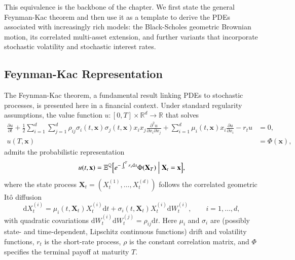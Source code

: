 \documentclass[12pt]{report} %
\theoremstyle{plain} %
\theoremstyle{definition} %
\theoremstyle{remark} %
\begin{document}
This equivalence is the backbone of the chapter. 
We first state the general Feynman-Kac theorem and then use it
as a template to derive the PDEs associated with increasingly rich
models: the Black-Scholes geometric Brownian motion, its correlated
multi-asset extension, and further variants that incorporate
stochastic volatility and stochastic interest rates. 

\subsection{Feynman-Kac Representation}\label{sec:feynman_kac}

The Feynman-Kac theorem, a fundamental result linking PDEs to stochastic processes, is presented here in a financial context.
Under standard regularity assumptions, the value function \(u:[0,T]\times\mathbb R^d\to\mathbb R\) that solves
\begin{equation}\label{eq:fk_pde_multi}
	\begin{aligned}
		\frac{\partial u}{\partial t}
		+ \frac{1}{2}\sum_{i=1}^{d}\sum_{j=1}^{d}
		 \rho_{ij}\sigma_i(t,\mathbf x)\sigma_j(t,\mathbf x)x_i x_j
		 \frac{\partial^{2}u}{\partial x_i\partial x_j}
		+ \sum_{i=1}^{d}\mu_i(t,\mathbf x)x_i\frac{\partial u}{\partial x_i}
		- r_t u &= 0,\\
		u(T,\mathbf x)&=\Phi(\mathbf x),
	\end{aligned}
\end{equation}
admits the probabilistic representation
\begin{equation}\label{eq:feynman_kac}
	u(t,\mathbf x)=
	\mathbb E^{\mathbb Q}\Bigl[
		e^{-\int_t^{T} r_s \mathrm ds}
		\Phi(\mathbf X_T)
		\Bigm| \mathbf X_t=\mathbf x
	\Bigr],
\end{equation}
where the state process \(\mathbf X_t=(X_t^{(1)},\ldots,X_t^{(d)})\) follows the correlated geometric It\^o diffusion
\begin{equation}\label{eq:general_sde}
	\mathrm dX_t^{(i)}
		=\mu_i(t,\mathbf X_t)X_t^{(i)} \mathrm dt
		+ \sigma_i(t,\mathbf X_t)X_t^{(i)} \mathrm dW_t^{(i)},
	\qquad i=1,\ldots,d,
\end{equation}
with quadratic covariations \(\mathrm dW_t^{(i)}\mathrm dW_t^{(j)}=\rho_{ij} \mathrm dt\).
Here \(\mu_i\) and \(\sigma_i\) are (possibly state- and time-dependent, Lipschitz continuous functions) drift and volatility functions, \(r_t\) is the short-rate
process, \(\rho\) is the constant correlation matrix, and
\(\Phi\) specifies the terminal payoff at maturity \(T\).
\end{document}
